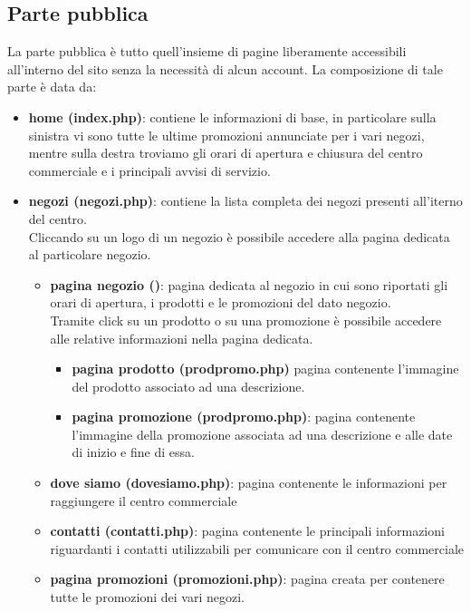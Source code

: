 \documentclass[a4paper,12pt]{article}
\begin{document}
\subsection{Parte pubblica}
La parte pubblica è tutto quell'insieme di pagine liberamente accessibili all'interno del sito senza la necessità di alcun account. La composizione di tale parte è data da:
\begin{itemize}
	\item \textbf{home (index.php)}: contiene le informazioni di base, in particolare sulla sinistra vi sono tutte le ultime promozioni annunciate per i vari negozi, mentre sulla destra troviamo gli orari di apertura e chiusura del centro commerciale e i principali avvisi di servizio.\\
	
	\item \textbf{negozi (negozi.php)}: contiene la lista completa dei negozi presenti all'iterno del centro.\\
	Cliccando su un logo di un negozio è possibile accedere alla pagina dedicata al particolare negozio.
	\begin{itemize}
		\item \textbf{pagina negozio ()}: pagina dedicata al negozio in cui sono riportati gli orari di apertura, i prodotti e le promozioni del dato negozio.\\
		Tramite click su un prodotto o su una promozione è possibile accedere alle relative informazioni nella pagina dedicata.
		\begin{itemize}
		\item \textbf{pagina prodotto (prodpromo.php)} pagina contenente l'immagine del prodotto associato ad una descrizione.\\
		\item \textbf{pagina promozione (prodpromo.php)}: pagina contenente l'immagine della promozione associata ad una descrizione e alle date di inizio e fine di essa.
	\end{itemize}
	\item \textbf{dove siamo (dovesiamo.php)}: pagina contenente le informazioni per raggiungere il centro commerciale
	\item \textbf{contatti (contatti.php)}: pagina contenente le principali informazioni riguardanti i contatti utilizzabili per comunicare con il centro commerciale
	\item \textbf{pagina promozioni (promozioni.php)}: pagina creata per contenere tutte le promozioni dei vari negozi.
	\end{itemize}
\end{itemize}
\end{document}
